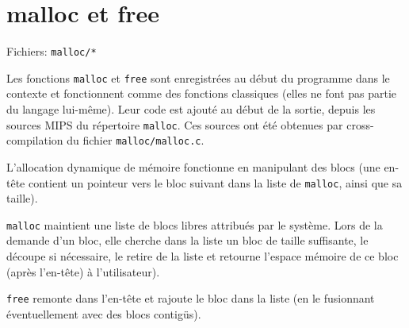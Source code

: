 \documentclass{article}
\begin{document}
	\section{malloc et free}
		\par Fichiers: \verb#malloc/*#
		\par Les fonctions \verb#malloc# et \verb#free# sont enregistrées au début du programme dans le contexte et fonctionnent comme des fonctions classiques (elles ne font pas partie du langage lui-même). Leur code est ajouté au début de la sortie, depuis les sources MIPS du répertoire \verb#malloc#. Ces sources ont été obtenues par cross-compilation du fichier \verb#malloc/malloc.c#.
		\par L'allocation dynamique de mémoire fonctionne en manipulant des blocs (une en-tête contient un pointeur vers le bloc suivant dans la liste de \verb#malloc#, ainsi que sa taille).
		\par \verb#malloc# maintient une liste de blocs libres attribués par le système. Lors de la demande d'un bloc, elle cherche dans la liste un bloc de taille suffisante, le découpe si nécessaire, le retire de la liste et retourne l'espace mémoire de ce bloc (après l'en-tête) à l'utilisateur).
		\par \verb#free# remonte dans l'en-tête et rajoute le bloc dans la liste (en le fusionnant éventuellement avec des blocs contigüs).
\end{document}
